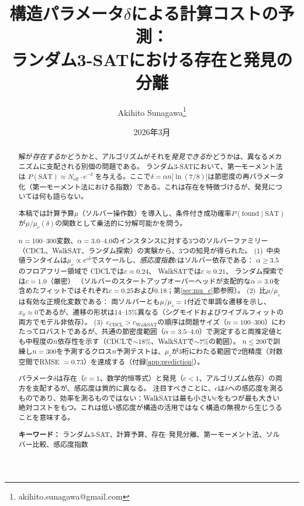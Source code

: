 \documentclass[11pt,a4paper]{article}
\title{構造パラメータ$\delta$による計算コストの予測：\\ランダム3-SATにおける存在と発見の分離}
\author{Akihito Sunagawa\thanks{akihito.sunagawa@gmail.com}}
\date{2026年3月}
\newcommand{\mc}{\mu_c}
\newcommand{\Neff}{N_{\text{eff}}}
\newcommand{\PSAT}{P(\text{SAT})}
\newcommand{\PfSAT}{P(\text{found}\mid\text{SAT})}
\begin{document}
\maketitle

\begin{abstract}
解が\emph{存在する}かどうかと、アルゴリズムがそれを\emph{発見できる}かどうかは、異なるメカニズムに支配される別個の問題である。
ランダム3-SATにおいて、第一モーメント法は
$\PSAT \approx \Neff \cdot e^{-\delta}$
を与える。ここで$\delta = \alpha n |\!\ln(7/8)|$は節密度の再パラメータ化（第一モーメント法における指数）である。これは存在を特徴づけるが、発見については何も語らない。

本稿では計算予算$\mu$（ソルバー操作数）を導入し、条件付き成功確率$\PfSAT$が$\mu / \mc(\delta)$の関数として乗法的に分解可能かを問う。

$n = 100$--$300$変数、$\alpha = 3.0$--$4.0$のインスタンスに対する3つのソルバーファミリー（CDCL、WalkSAT、ランダム探索）の実験から、3つの知見が得られた。
(1)~中央値ランタイムは$\mc \propto e^{c\delta}$でスケールし、\emph{感応度指数}$c$はソルバー依存である：
$\alpha \geq 3.5$のフロアフリー領域で
CDCLでは$c \approx 0.24$、
WalkSATでは$c \approx 0.21$、
ランダム探索では$c = 1.0$（厳密）
（ソルバーのスタートアップオーバーヘッドが支配的な$\alpha = 3.0$を含めたフィットではそれぞれ$c = 0.25$および$0.18$；第\ref{sec:mu_c}節参照）。
(2)~比$\mu/\mc$は有効な正規化変数である：
両ソルバーとも$\mu/\mc = 1$付近で単調な遷移を示し、$x_0 \approx 0$であるが、遷移の形状は14--15\%異なる（シグモイドおよびワイブルフィットの両方でモデル非依存）。
(3)~$c_{\text{CDCL}} > c_{\text{WalkSAT}}$の順序は問題サイズ（$n = 100$--$300$）にわたってロバストであるが、共通の節密度範囲（$\alpha = 3.5$--$4.0$）で測定すると両推定値とも中程度の$n$依存性を示す（CDCLで${\sim}18\%$、WalkSATで${\sim}7\%$の範囲）。
$n \leq 200$で訓練し$n = 300$を予測するクロス$n$予測テストは、$\mc$が3桁にわたる範囲で2倍精度（対数空間でRMSE $= 0.73$）を達成する（付録\ref{app:prediction}）。

パラメータ$\delta$は存在（$c=1$、数学的恒等式）と発見（$c < 1$、アルゴリズム依存）の両方を支配するが、感応度は質的に異なる。
注目すべきことに、$c$は$\delta$への感応度を測るものであり、効率を測るものではない：WalkSATは最も小さい$c$をもつが最も大きい絶対コストをもつ。これは低い感応度が構造の活用ではなく構造の無視から生じうることを意味する。

\medskip
\noindent\textbf{キーワード：} ランダム3-SAT、計算予算、存在--発見分離、第一モーメント法、ソルバー比較、感応度指数
\end{abstract}
\end{document}
